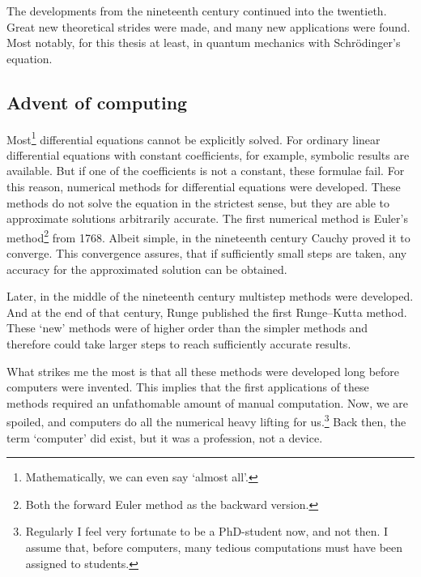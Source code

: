 The developments from the nineteenth century continued into the twentieth. Great new theoretical strides were made, and many new applications were found. Most notably, for this thesis at least, in quantum mechanics with Schrödinger's equation.

\subsection{Advent of computing}

Most\footnote{Mathematically, we can even say `almost all'.} differential equations cannot be explicitly solved. For ordinary linear differential equations with constant coefficients, for example, symbolic results are available. But if one of the coefficients is not a constant, these formulae fail. For this reason, numerical methods for differential equations were developed. These methods do not solve the equation in the strictest sense, but they are able to approximate solutions arbitrarily accurate. The first numerical method is Euler's method\footnote{Both the forward Euler method as the backward version.} from 1768. Albeit simple, in the nineteenth century Cauchy proved it to converge. This convergence assures, that if sufficiently small steps are taken, any accuracy for the approximated solution can be obtained.

Later, in the middle of the nineteenth century multistep methods were developed. And at the end of that century, Runge published the first Runge--Kutta method. These `new' methods were of higher order than the simpler methods and therefore could take larger steps to reach sufficiently accurate results.

What strikes me the most is that all these methods were developed long before computers were invented. This implies that the first applications of these methods required an unfathomable amount of manual computation. Now, we are spoiled, and computers do all the numerical heavy lifting for us.\footnote{Regularly I feel very fortunate to be a PhD-student now, and not then. I assume that, before computers, many tedious computations must have been assigned to students.} Back then, the term `computer' did exist, but it was a profession, not a device.

